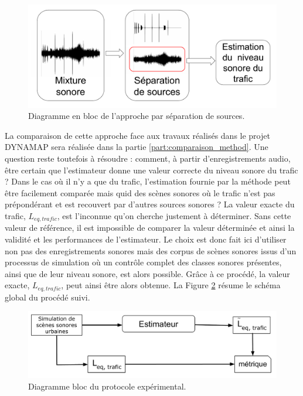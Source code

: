 \begin{figure}[ht]
\centering
\includegraphics[width=0.7\linewidth]{./figures/NMF/bloc_diagram_source_separation.pdf}
\caption{Diagramme en bloc de l'approche par séparation de sources.}
\label{fig:separation_source}
\end{figure}

La comparaison de cette approche face aux travaux réalisés dans le projet DYNAMAP sera réalisée dans la partie \ref{part:comparaison_method}. Une question reste toutefois à résoudre : comment, à partir d'enregistrements audio, être certain que l'estimateur donne une valeur correcte du niveau sonore du trafic ? Dans le cas où il n'y a que du trafic, l'estimation fournie par la méthode peut être facilement comparée mais quid des scènes sonores où le trafic n'est pas prépondérant et est recouvert par d'autres sources sonores ? La valeur exacte du trafic, $L_{eq,trafic}$, est l'inconnue qu'on cherche justement à déterminer. Sans cette valeur de référence, il est impossible de comparer la valeur déterminée et ainsi la validité et les performances de l'estimateur.
Le choix est donc fait ici d'utiliser non pas des enregistrements sonores mais des corpus de scènes sonores issus d'un processus de simulation où un contrôle complet des classes sonores présentes, ainsi que de leur niveau sonore, est alors possible. Grâce à ce procédé, la valeur exacte, $L_{eq,trafic}$, peut ainsi être alors obtenue. La Figure \ref{fig:diagramBlocProtocol} résume le schéma global du procédé suivi.

\begin{figure}[ht]
\centering
\includegraphics[width=0.7\linewidth]{./figures/NMF/Bloc_diagram_estimateur_FR.pdf}
\caption{Diagramme bloc du protocole expérimental.}
\label{fig:diagramBlocProtocol}
\end{figure}

